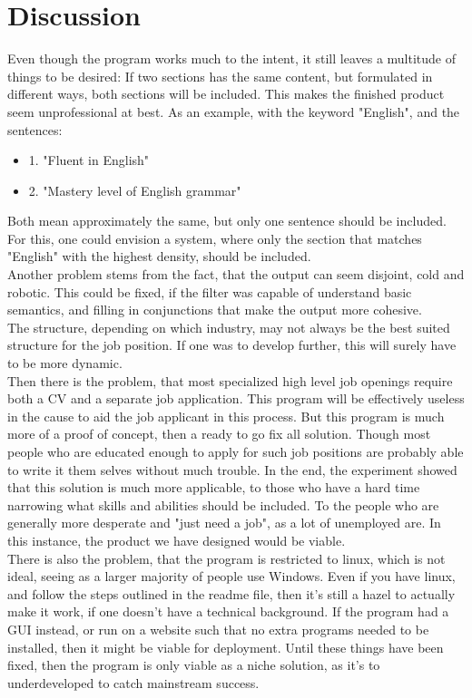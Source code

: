 \section{Discussion}\label{sec:discussion}
Even though the program works much to the intent, it still leaves a multitude of things to be desired:
If two sections has the same content, but formulated in different ways, both sections will be included.
This makes the finished product seem unprofessional at best. As an example, with the keyword "English", and the sentences:
\begin{itemize}
  \item 1. "Fluent in English"
  \item 2. "Mastery level of English grammar"
\end{itemize}
Both mean approximately the same, but only one sentence should be included. For this, one could envision a system, where only the section that matches "English" with the highest density, should be included.\\

Another problem stems from the fact, that the output can seem disjoint, cold and robotic. This could be fixed, if the filter was capable of understand basic semantics, and filling in conjunctions that make the output more cohesive.\\

The structure, depending on which industry, may not always be the best suited structure for the job position. If one was to develop further, this will surely have to be more dynamic.\\

Then there is the problem, that most specialized high level job openings require both a CV and a separate job application. This program will be effectively useless in the cause to aid the job applicant in this process.
But this program is much more of a proof of concept, then a ready to go fix all solution.
Though most people who are educated enough to apply for such job positions are probably able to write it them selves without much trouble.
In the end, the experiment showed that this solution is much more applicable, to those who have a hard time narrowing what skills and abilities should be included.
To the people who are generally more desperate and "just need a job", as a lot of unemployed are.
In this instance, the product we have designed would be viable.\\

There is also the problem, that the program is restricted to linux, which is not ideal, seeing as a larger majority of people use Windows.
Even if you have linux, and follow the steps outlined in the readme file, then it's still a hazel to actually make it work, if one doesn't have a technical background.
If the program had a GUI instead, or run on a website such that no extra programs needed to be installed, then it might be viable for deployment.
Until these things have been fixed, then the program is only viable as a niche solution, as it's to underdeveloped to catch mainstream success.